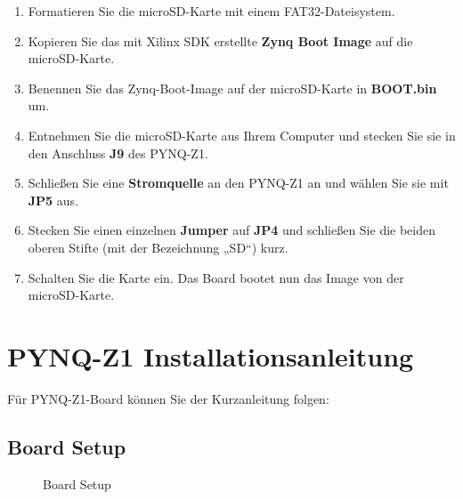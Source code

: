 \documentclass[a4paper]{report}
\begin{document}
	\begin{enumerate} 
	
		\item Formatieren Sie die microSD-Karte mit einem FAT32-Dateisystem.
		\item Kopieren Sie das mit Xilinx SDK erstellte \textbf{Zynq Boot Image} auf die microSD-Karte.
		\item Benennen Sie das Zynq-Boot-Image auf der microSD-Karte in\textbf{ BOOT.bin }um.
		\item Entnehmen Sie die microSD-Karte aus Ihrem Computer und stecken Sie sie in den Anschluss\textbf{ J9} des PYNQ-Z1.
		\item Schließen Sie eine\textbf{ Stromquelle} an den PYNQ-Z1 an und wählen Sie sie mit\textbf{ JP5 }aus.
		\item Stecken Sie einen einzelnen\textbf{ Jumper} auf \textbf{ JP4 } und schließen Sie die beiden oberen Stifte (mit der Bezeichnung „SD“) kurz.
		\item Schalten Sie die Karte ein. Das Board bootet nun das Image von der microSD-Karte.

	\end{enumerate}




\section{PYNQ-Z1 Installationsanleitung}
Für PYNQ-Z1-Board können Sie der Kurzanleitung folgen:


\subsection{Board Setup}

	\begin{figure}[H]
	\centering
	\caption{Board Setup}
	\label{fig:Board_Setup}
	\end{figure}
\end{document}
